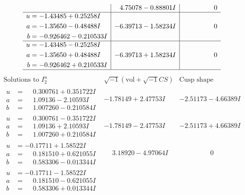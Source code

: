 \documentclass[1p]{elsarticle_modified}
\theoremstyle{definition}
\newcommand{\I}{\sqrt{-1}}
\begin{document}
$$\begin{array}{c|c|c}
 & \phantom{-}4.75078 - 0.88801 I & \phantom{-0.000000 } 0 \\ \hline\begin{aligned}
u &= -1.43485 + 0.25258 I \\
a &= -1.35650 - 0.48488 I \\
b &= -0.926462 - 0.210533 I\end{aligned}
 & -6.39713 - 1.58234 I & \phantom{-0.000000 } 0 \\ \hline\begin{aligned}
u &= -1.43485 - 0.25258 I \\
a &= -1.35650 + 0.48488 I \\
b &= -0.926462 + 0.210533 I\end{aligned}
 & -6.39713 + 1.58234 I & \phantom{-0.000000 } 0\\
 \hline 
 \end{array}$$\newpage$$\begin{array}{c|c|c}  
\text{Solutions to }I^u_{2}& \I (\text{vol} + \sqrt{-1}CS) & \text{Cusp shape}\\
 \hline 
\begin{aligned}
u &= \phantom{-}0.300761 + 0.351722 I \\
a &= \phantom{-}1.09136 - 2.10593 I \\
b &= \phantom{-}1.007260 - 0.210584 I\end{aligned}
 & -1.78149 + 2.47753 I & -2.51173 - 4.66389 I \\ \hline\begin{aligned}
u &= \phantom{-}0.300761 - 0.351722 I \\
a &= \phantom{-}1.09136 + 2.10593 I \\
b &= \phantom{-}1.007260 + 0.210584 I\end{aligned}
 & -1.78149 - 2.47753 I & -2.51173 + 4.66389 I \\ \hline\begin{aligned}
u &= -0.17711 + 1.58522 I \\
a &= \phantom{-}0.181510 + 0.621055 I \\
b &= \phantom{-}0.583306 - 0.013344 I\end{aligned}
 & \phantom{-}3.18920 - 4.97064 I & \phantom{-0.000000 } 0 \\ \hline\begin{aligned}
u &= -0.17711 - 1.58522 I \\
a &= \phantom{-}0.181510 - 0.621055 I \\
b &= \phantom{-}0.583306 + 0.013344 I\end{aligned}

\end{array}$$
\end{document}
